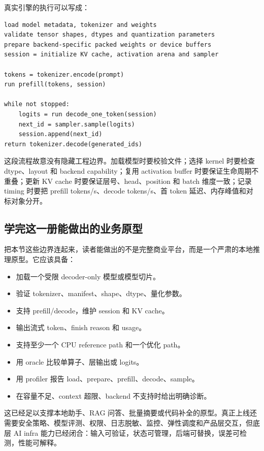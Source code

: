 真实引擎的执行可以写成：

\begin{lstlisting}[numbers=none,caption={本地大模型推理引擎执行流程}]
load model metadata, tokenizer and weights
validate tensor shapes, dtypes and quantization parameters
prepare backend-specific packed weights or device buffers
session = initialize KV cache, activation arena and sampler

tokens = tokenizer.encode(prompt)
run prefill(tokens, session)

while not stopped:
    logits = run decode_one_token(session)
    next_id = sampler.sample(logits)
    session.append(next_id)
return tokenizer.decode(generated_ids)
\end{lstlisting}

这段流程故意没有隐藏工程边界。加载模型时要校验文件；选择 kernel 时要检查 dtype、layout 和 backend capability；复用 activation buffer 时要保证生命周期不重叠；更新 KV cache 时要保证层号、head、position 和 batch 维度一致；记录 timing 时要把 prefill tokens/s、decode tokens/s、首 token 延迟、内存峰值和对标对象分开。

\subsection{学完这一册能做出的业务原型}

把本节这些边界连起来，读者能做出的不是完整商业平台，而是一个严肃的本地推理原型。它应该具备：

\begin{itemize}
  \item 加载一个受限 decoder-only 模型或模型切片。
  \item 验证 tokenizer、manifest、shape、dtype、量化参数。
  \item 支持 prefill/decode，维护 session 和 KV cache。
  \item 输出流式 token、finish reason 和 usage。
  \item 支持至少一个 CPU reference path 和一个优化 path。
  \item 用 oracle 比较单算子、层输出或 logits。
  \item 用 profiler 报告 load、prepare、prefill、decode、sample。
  \item 在容量不足、context 超限、backend 不支持时给出明确诊断。
\end{itemize}

这已经足以支撑本地助手、RAG 问答、批量摘要或代码补全的原型。真正上线还需要安全策略、模型评测、权限、日志脱敏、监控、弹性调度和产品层交互，但底层 AI infra 能力已经闭合：输入可验证，状态可管理，后端可替换，误差可检测，性能可解释。

